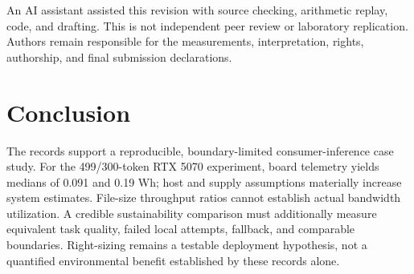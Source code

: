 \documentclass[conference]{IEEEtran}
\begin{document}
An AI assistant assisted this revision with source checking, arithmetic
replay, code, and drafting. This is not independent peer review or laboratory
replication. Authors remain responsible for the measurements,
interpretation, rights, authorship, and final submission declarations.

\section{Conclusion}
The records support a reproducible, boundary-limited consumer-inference
case study. For the 499/300-token RTX 5070 experiment, board telemetry yields
medians of 0.091 and 0.19 Wh; host and supply assumptions materially increase
system estimates. File-size throughput ratios cannot establish actual
bandwidth utilization. A credible sustainability comparison must additionally
measure equivalent task quality, failed local attempts, fallback, and
comparable boundaries. Right-sizing remains a testable deployment hypothesis,
not a quantified environmental benefit established by these records alone.



\end{document}

